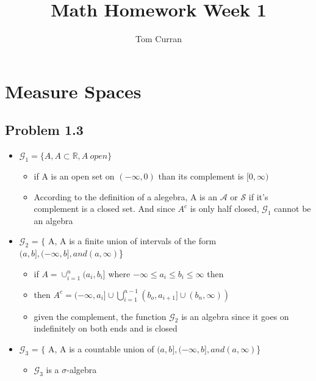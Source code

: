 \documentclass{article}
\title{Math Homework Week 1}
\author{Tom Curran}
\theoremstyle{definition}
\begin{document}
\maketitle{}
\section{Measure Spaces}

\subsection{Problem 1.3}
\begin{itemize}

\item$\mathcal{G}_1 = \{A, A \subset \mathbb{R}, A \ open \}$

\begin{itemize}
\item if A is an open set on $(-\infty, 0)$ than its complement is $[0, \infty)$
\item According to the definition of a alegebra, A is an $\mathcal{A}$ or $\mathcal{S}$ if it's complement is a closed set. And since $A^c$ is only half closed, $\mathcal{G}_1$ cannot be an algebra
\end{itemize}

\item$\mathcal{G}_2$ = $\{$ A, A is a finite union of intervals of the form $(a,b], (-\infty, b], and (a,\infty) $\}

\begin{itemize}
  \item if $A = \cup_{i=1}^n (a_i, b_i] $ where $-\infty \leq a_i \leq b_i \leq \infty$ then
  \item then $A^c = (-\infty,a_i] \cup \bigcup_{i=1}^{n-1}(b_o,a_{i+1}] \cup (b_n, \infty)) $
  \item given the complement, the function $\mathcal{G}_2$ is an algebra since it goes on indefinitely on both ends and is closed
\end{itemize}
\item$\mathcal{G}_3$ = $\{$ A, A is a countable union of $(a,b], (-\infty, b], and (a,\infty) $\}
  \begin{itemize}

  \item $\mathcal{G}_3$ is a $\sigma$-algebra

  \end{itemize}

\end{itemize}
\end{document}

